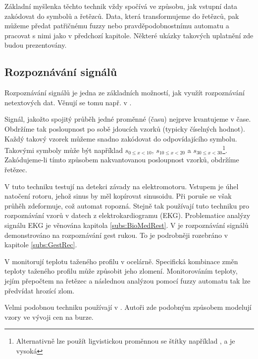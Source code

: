 Základní myšlenka těchto technik vždy spočívá ve způsobu, jak vstupní data zakódovat do symbolů a řetězců. Data, která transformujeme do řetězců, pak můžeme předat patřičnému fuzzy nebo pravděpodobnostnímu automatu a pracovat s nimi jako v předchozí kapitole. Některé ukázky takových uplatnění zde budou prezentovány. 

\subsection{Rozpoznávání signálů} \label{subs:RozpSign}
Rozpoznávání signálů je jedna ze základních možností, jak využít rozpoznávání netextových dat. Věnují se tomu např. v \cite{MukRay-StaSplMerProbFiStaAuSigRepAna, Rig-FauDetIsoBasFuzzAut, BaiTri-PattRecUsiTemFuzzAut, KemAda-SeqPatRecEmpRecFuzSys}.

Signál, jakožto spojitý průběh jedné proměnné (času) nejprve kvantujeme v čase. Obdržíme tak posloupnost po sobě jdoucích vzorků (typicky číselných hodnot). Každý takový vzorek můžeme snadno zakódovat do odpovídajícího symbolu. Takovými symboly může být například $s_{0 \leq x < 10}$, $s_{10 \leq x < 20}$ a $s_{30 \leq x < 30}$\footnote{Alternativně lze použít ligvistickou proměnnou se štítky například ,  a  je vysoká}. Zakódujeme-li tímto způsobem nakvantovanou posloupnost vzorků, obdržíme řetězec.


V \cite{Rig-FauDetIsoBasFuzzAut} tuto techniku testují na detekci závady na elektromotoru. Vstupem je úhel natočení rotoru, jehož sinus by měl kopírovat sinusoidu. Při poruše se však průhěh zdeformuje, což automat ropozná. Stejně tak používají tuto techniku pro rozpoznávání vzorů v datech z elektrokardiogramu (EKG). Problematice analýzy signálu EKG je věnována kapitola \ref{subs:BioMedRest}. V \cite{BaiTri-PattRecUsiTemFuzzAut} je rozpoznávání signálů demonstrováno na rozpoznávání gest rukou. To je podrobněji rozebráno v kapitole \ref{subs:GestRec}.

V \cite{KemAda-SeqPatRecEmpRecFuzSys} monitorují teplotu taženého profilu v ocelárně. Specifická kombinace změn teploty taženého profilu může způsobit jeho zlomení. Monitorováním teploty, jejím přepočtem na řetězec a následnou analýzou pomocí fuzzy automatu tak lze předvídat hrozící zlom.

Velmi podobnou techniku používají v \cite{ManPra-PriPatDetUsFiStMaFuzTra}. Autoři zde podobným způsobem modelují vzory ve vývoji cen na burze.

